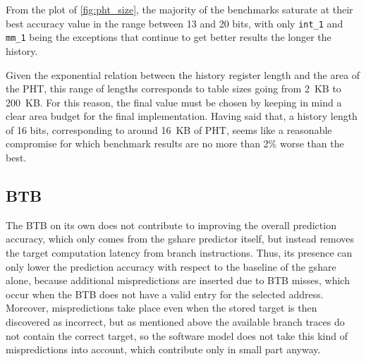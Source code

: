 From the plot of \cref{fig:pht_size}, the majority of the benchmarks saturate at their best accuracy value in the range between 13 and 20 bits, with only \texttt{int\_1} and \texttt{mm\_1} being the exceptions that continue to get better results the longer the history. 

Given the exponential relation between the history register length and the area of the \ac{PHT}, this range of lengths corresponds to table sizes going from \SI{2}{KB} to \SI{200}{KB}. For this reason, the final value must be chosen by keeping in mind a clear area budget for the final implementation. Having said that, a history length of 16 bits, corresponding to around \SI{16}{KB} of \ac{PHT}, seems like a reasonable compromise for which benchmark results are no more than 2\% worse than the best.

\subsection{\acs{BTB}}
The \ac{BTB} on its own does not contribute to improving the overall prediction accuracy, which only comes from the gshare predictor itself, but instead removes the target computation latency from branch instructions. Thus, its presence can only lower the prediction accuracy with respect to the baseline of the gshare alone, because additional mispredictions are inserted due to \ac{BTB} misses, which occur when the \ac{BTB} does not have a valid entry for the selected address. Moreover, mispredictions take place even when the stored target is then discovered as incorrect, but as mentioned above the available branch traces do not contain the correct target, so the software model does not take this kind of mispredictions into account, which contribute only in small part anyway.
